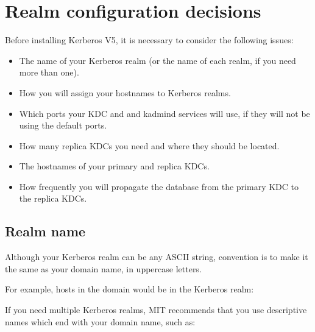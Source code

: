 \documentclass[letterpaper,10pt,english]{sphinxmanual}
\begin{document}
\chapter{Realm configuration decisions}
\label{\detokenize{admin/realm_config:realm-configuration-decisions}}\label{\detokenize{admin/realm_config::doc}}
\sphinxAtStartPar
Before installing Kerberos V5, it is necessary to consider the
following issues:
\begin{itemize}
\item {} 
\sphinxAtStartPar
The name of your Kerberos realm (or the name of each realm, if you
need more than one).

\item {} 
\sphinxAtStartPar
How you will assign your hostnames to Kerberos realms.

\item {} 
\sphinxAtStartPar
Which ports your KDC and and kadmind services will use, if they will
not be using the default ports.

\item {} 
\sphinxAtStartPar
How many replica KDCs you need and where they should be located.

\item {} 
\sphinxAtStartPar
The hostnames of your primary and replica KDCs.

\item {} 
\sphinxAtStartPar
How frequently you will propagate the database from the primary KDC
to the replica KDCs.

\end{itemize}


\section{Realm name}
\label{\detokenize{admin/realm_config:realm-name}}
\sphinxAtStartPar
Although your Kerberos realm can be any ASCII string, convention is to
make it the same as your domain name, in upper\sphinxhyphen{}case letters.

\sphinxAtStartPar
For example, hosts in the domain  would be in the
Kerberos realm:

\begin{sphinxVerbatim}[commandchars=\\\{\}]
\end{sphinxVerbatim}

\sphinxAtStartPar
If you need multiple Kerberos realms, MIT recommends that you use
descriptive names which end with your domain name, such as:
\end{document}
